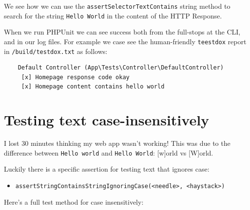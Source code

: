 \documentclass[a4paperpaper,openright]{book}
\newenvironment{Shaded}{}{}
\newcommand{\CommentTok}[1]{\textcolor[rgb]{0.38,0.63,0.69}{\textit{#1}}}
\newcommand{\KeywordTok}[1]{\textcolor[rgb]{0.00,0.44,0.13}{\textbf{#1}}}
\newcommand{\NormalTok}[1]{#1}
\newcommand{\OtherTok}[1]{\textcolor[rgb]{0.00,0.44,0.13}{#1}}
\newcommand{\StringTok}[1]{\textcolor[rgb]{0.25,0.44,0.63}{#1}}
\providecommand{\tightlist}{%
  \setlength{\itemsep}{0pt}\setlength{\parskip}{0pt}}
\begin{document}
We see how we can use the \texttt{assertSelectorTextContains} string
method to search for the string \texttt{Hello\ World} in the content of
the HTTP Response.

When we run PHPUnit we can see success both from the full-stops at the
CLI, and in our log files. For example we case see the human-friendly
\texttt{teestdox} report in \texttt{/build/testdox.txt} as follows:

\begin{verbatim}
    Default Controller (App\Tests\Controller\DefaultController)
     [x] Homepage response code okay
     [x] Homepage content contains hello world
\end{verbatim}

\hypertarget{testing-text-case-insensitively}{%
\section{Testing text
case-insensitively}\label{testing-text-case-insensitively}}

I lost 30 minutes thinking my web app wasn't working! This was due to
the difference between \texttt{Hello\ world} and \texttt{Hello\ World}:
{[}w{]}orld vs {[}W{]}orld.

Luckily there is a specific assertion for testing text that ignores
case:

\begin{itemize}
\tightlist
\item
  \texttt{assertStringContainsStringIgnoringCase(\textless{}needle\textgreater{},\ \textless{}haystack\textgreater{})}
\end{itemize}

Here's a full test method for case insensitively:

\begin{Shaded}
\end{Shaded}
\end{document}
